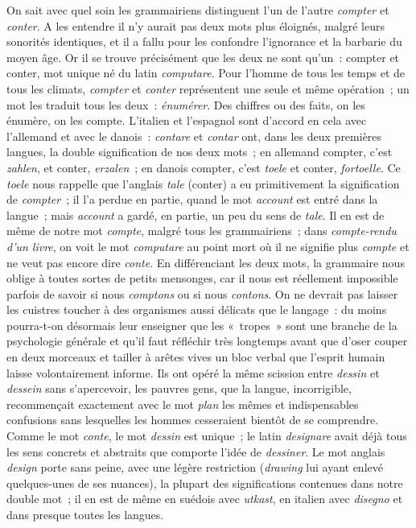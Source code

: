 \documentclass[french,twoside]{book} %
\begin{document}
\noindent On sait avec quel soin les grammairiens distinguent l’un de l’autre {\itshape compter} et {\itshape conter}. A les entendre il n’y aurait pas deux mots plus éloignés, malgré leurs sonorités identiques, et il a fallu pour les confondre l’ignorance et la barbarie du moyen âge. Or il se trouve précisément que les deux ne sont qu’un : compter et conter, mot unique né du latin {\itshape computare}. Pour l’homme de tous les temps et de tous les climats, {\itshape compter} et {\itshape conter} représentent une seule et même opération ; un mot les traduit tous les deux : {\itshape énumérer}. Des chiffres ou des faits, on les énumère, on les compte. L’italien et l’espagnol sont d’accord en cela avec l’allemand et avec le danois : {\itshape contare} et {\itshape contar} ont, dans les deux premières langues, la double signification de nos deux mots ; en allemand compter, c’est {\itshape zahlen}, et conter, {\itshape erzalen} ; en danois compter, c’est {\itshape toele} et conter, {\itshape fortoelle}. Ce {\itshape toele} nous rappelle que l’anglais {\itshape tale} (conter) a eu primitivement la signification de {\itshape compter} ; il l’a perdue en partie, quand le mot {\itshape account} est entré dans la langue ; mais {\itshape account} a gardé, en partie, un peu du sens de {\itshape tale}. Il en est de même de notre mot {\itshape compte}, malgré tous les grammairiens ; dans {\itshape compte-rendu d’un livre}, on voit le mot {\itshape computare} au point mort où il ne signifie plus {\itshape compte} et ne veut pas encore dire {\itshape conte}. En différenciant les deux mots, la grammaire nous oblige à toutes sortes de petits mensonges, car il nous est réellement impossible parfois de savoir si nous {\itshape comptons} ou si nous {\itshape contons}. On ne devrait pas laisser les cuistres toucher à des organismes aussi délicats que le langage : du moins pourra-t-on désormais leur enseigner que les « tropes » sont une branche de la psychologie générale et qu’il faut réfléchir très longtemps avant que d’oser couper en deux morceaux et tailler à arêtes vives un bloc verbal que l’esprit humain laisse volontairement informe. Ils ont opéré la même scission entre {\itshape dessin} et {\itshape dessein} sans s’apercevoir, les pauvres gens, que la langue, incorrigible, recommençait exactement avec le mot {\itshape plan} les mêmes et indispensables confusions sans lesquelles les hommes cesseraient bientôt de se comprendre. Comme le mot {\itshape conte}, le mot {\itshape dessin} est unique ; le latin {\itshape designare} avait déjà tous les sens concrets et abstraits que comporte l’idée de {\itshape dessiner}. Le mot anglais {\itshape design} porte sans peine, avec une légère restriction ({\itshape drawing} lui ayant enlevé quelques-unes de ses nuances), la plupart des significations contenues dans notre double mot ; il en est de même en suédois avec {\itshape utkast}, en italien avec {\itshape disegno} et dans presque toutes les langues.\par
\end{document}
